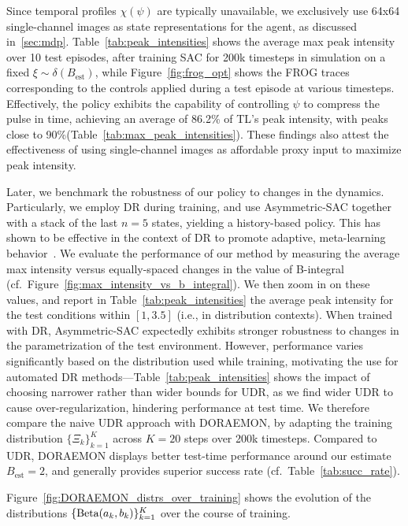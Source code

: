 Since temporal profiles \( \chi(\psi) \) are typically unavailable, we exclusively use 64x64 single-channel images as state representations for the agent, as discussed in~\ref{sec:mdp}. 
Table~\ref{tab:peak_intensities} shows the average max peak intensity over 10 test episodes, after training SAC for 200k timesteps in simulation on a fixed \( \xi \sim \delta(B_{\text{est}}) \), while Figure~\ref{fig:frog_opt} shows the FROG traces corresponding to the controls applied during a test episode at various timesteps. Effectively, the policy exhibits the capability of controlling \( \psi \) to compress the pulse in time, achieving an average of 86.2\% of TL's peak intensity, with peaks close to 90\%(Table~\ref{tab:max_peak_intensities}). These findings also attest the effectiveness of using single-channel images as affordable proxy input to maximize peak intensity.

Later, we benchmark the robustness of our policy to changes in the dynamics.
Particularly, we employ DR during training, and use Asymmetric-SAC together with a stack of the last \( n=5 \) states, yielding a history-based policy. This has shown to be effective in the context of DR to promote adaptive, meta-learning behavior~\citep{chen2021understanding, tiboni2023domain, akkaya2019solving}.
We evaluate the performance of our method by measuring the average max intensity versus equally-spaced changes in the value of B-integral (cf.~Figure~\ref{fig:max_intensity_vs_b_integral}). We then zoom in on these values, and report in Table~\ref{tab:peak_intensities} the average peak intensity for the test conditions within \( [1, 3.5] \) (i.e., in distribution contexts). When trained with DR, Asymmetric-SAC expectedly exhibits stronger robustness to changes in the parametrization of the test environment. However, performance varies significantly based on the distribution used while training, motivating the use for automated DR methods---Table~\ref{tab:peak_intensities} shows the impact of choosing narrower rather than wider bounds for UDR, as we find wider UDR to cause over-regularization, hindering performance at test time.
We therefore compare the naive UDR approach with DORAEMON, by adapting the training distribution \( \{ \Xi_{k} \}_{k=1}^K\) across \( K=20 \) steps over 200k timesteps. Compared to UDR, DORAEMON displays better test-time performance around our estimate \( B_{\text{est}} = 2 \), and generally provides superior success rate (cf.~Table~\ref{tab:succ_rate}).

Figure~\ref{fig:DORAEMON_distrs_over_training} shows the evolution of the distributions \(\{\text{Beta}(a_k, b_k) \}_{k=1}^{K} \) over the course of training.

